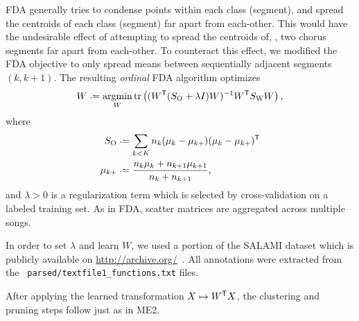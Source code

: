 \documentclass{article}
\begin{document}
FDA generally tries to condense points within each class (segment), and spread the centroids of each class
(segment) far apart from each-other.  This would have the undesirable effect of attempting to spread the
centroids of, \eg, two chorus segments far apart from each-other.  To counteract this effect, we modified the
FDA objective to only spread means between sequentially adjacent segments $(k, k+1)$.  
The resulting \emph{ordinal} FDA algorithm optimizes
\begin{equation}
W \defeq \argmin_W \trace\left( (W\trans (S_\text{O} + \lambda I) W)^{-1} W\trans S_\text{W} W \right)
\label{eq:ofda},
\end{equation}
where 
\begin{align*}
S_\text{O} &\defeq \sum_{k < K} n_k (\mu_k - \mu_{k+}) (\mu_k - \mu_{k+})\trans\\
\mu_{k+} &\defeq \frac{n_k \mu_k + n_{k+1} \mu_{k+1} }{n_k + n_{k+1}},
\end{align*}
and $\lambda > 0$ is a regularization term which is selected by cross-validation on a labeled training set. As
in FDA, scatter matrices are aggregated across multiple songs.

In order to set $\lambda$ and learn $W$, we used a portion of the SALAMI dataset which is publicly available
on \url{http://archive.org/}~\cite{smith2011design}.  All annotations were extracted from the {\tt
parsed/textfile1\_functions.txt} files.

After applying the learned transformation $X \mapsto W^\mathsf{T} X$, the clustering and pruning steps follow just as 
in ME2.


\end{document}
